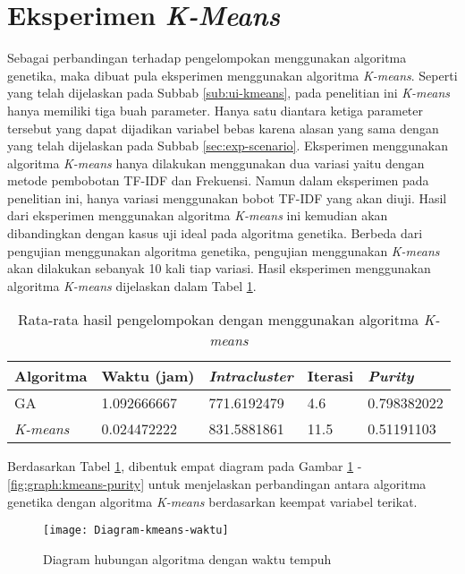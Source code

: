 \section{Eksperimen \textit{K-Means}}
Sebagai perbandingan terhadap pengelompokan menggunakan algoritma genetika, maka dibuat pula eksperimen menggunakan algoritma \textit{K-means}. Seperti yang telah dijelaskan pada Subbab \ref{sub:ui-kmeans}, pada penelitian ini \textit{K-means} hanya memiliki tiga buah parameter. Hanya satu diantara ketiga parameter tersebut yang dapat dijadikan variabel bebas karena alasan yang sama dengan yang telah dijelaskan pada Subbab \ref{sec:exp-scenario}. Eksperimen menggunakan algoritma \textit{K-means} hanya dilakukan menggunakan dua variasi yaitu dengan metode pembobotan TF-IDF dan Frekuensi. Namun dalam eksperimen pada penelitian ini, hanya variasi menggunakan bobot TF-IDF yang akan diuji. Hasil dari eksperimen menggunakan algoritma \textit{K-means} ini kemudian akan dibandingkan dengan kasus uji ideal pada algoritma genetika. Berbeda dari pengujian menggunakan algoritma genetika, pengujian menggunakan \textit{K-means} akan dilakukan sebanyak 10 kali tiap variasi. Hasil eksperimen menggunakan algoritma \textit{K-means} dijelaskan dalam Tabel \ref{tbl:exp-kmeans}.

\begin{table}[H]
	\centering
	\begin{tabular}{|l|l|l|l|l|} \hline
		Algoritma & Waktu (jam) & \textit{Intracluster} & Iterasi& \textit{Purity} \\ \hline
		GA      & 1.092666667 & 771.6192479 & 4.6  & 0.798382022 \\ \hline
		\textit{K-means} & 0.024472222 & 831.5881861 & 11.5 & 0.51191103 \\ \hline
	\end{tabular}
	\caption{Rata-rata hasil pengelompokan dengan menggunakan algoritma \textit{K-means}}
	\label{tbl:exp-kmeans}
\end{table}

Berdasarkan Tabel \ref{tbl:exp-kmeans}, dibentuk empat diagram pada Gambar \ref{fig:graph:kmeans-time} - \ref{fig:graph:kmeans-purity} untuk menjelaskan perbandingan antara algoritma genetika dengan algoritma \textit{K-means} berdasarkan keempat variabel terikat.

\begin{figure}[H]
	\centering
	\texttt{[image: Diagram-kmeans-waktu]}
	\caption{Diagram hubungan algoritma dengan waktu tempuh}
	\label{fig:graph:kmeans-time}
\end{figure}

